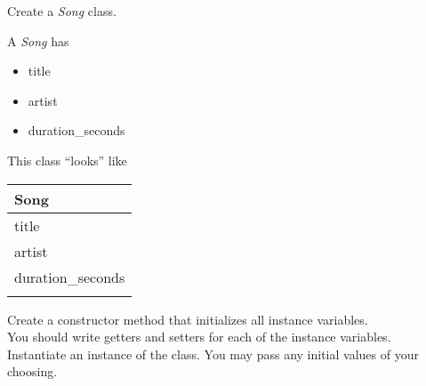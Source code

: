 	\item Create a \textit{Song} class.\\
	\begin{minipage}{.6\textwidth}		
		A \textit{Song} has
		\begin{itemize}
			\item title 
			\item artist
			\item duration\_seconds	
		\end{itemize}
	\end{minipage}
	\begin{minipage}{.4\textwidth}
		This class ``looks'' like 
				
		\vspace*{1em}
		\begin{tabular}{|l|}
			\hline Song\\ \hline
			title\\ artist\\ duration\_seconds\\ \hline
			\\  \hline
		\end{tabular}
	\end{minipage}

	\vspace*{2ex}
	Create a constructor method that initializes all instance variables.\\
	You should write getters and setters for each of the instance variables.\\
	Instantiate an instance of the class. You may pass any initial values of your choosing.



